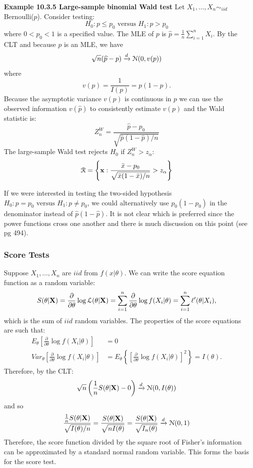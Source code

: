 \documentclass[11pt,]{article}
\newcommand{\Xndots}{X_1, \ldots, X_n}
\def\bx{{\bf x}}
\def\bX{{\bf X}}
\def\phat{{\widehat p}}
\def\xbar{\bar{ x}}
\def\Lsc{{\cal L}}
\def\Nsc{{\cal N}}
\def\Rsc{{\cal R}}
\def\sumin{\sum_{i=1}^n}
\begin{document}
\noindent\textbf{Example 10.3.5 Large-sample binomial Wald test} Let
\(\Xndots \sim_{iid}\) Bernoulli(\(p\)). Consider testing:
\[H_0: p \leq p_0 \mbox{ versus } H_1: p > p_0\] where \(0<p_0<1\) is a
specified value. The MLE of \(p\) is \(\phat = \frac{1}{n}\sumin{X_i}.\)
By the CLT and because \(\phat\) is an MLE, we have
\[\sqrt{n}(\phat - p) \xrightarrow{d} \Nsc(0, v(p))\] where
\[v(p) = \frac{1}{I(p)} = p(1-p).\] Because the asymptotic variance
\(v(p)\) is continuous in \(p\) we can use the observed information
\(v(\phat)\) to consistently estimate \(v(p)\) and the Wald statistic
is: \[Z_n^W = \frac{\phat - p_0}{\sqrt{\phat(1-\phat)/n}}\] The
large-sample Wald test rejects \(H_0\) if \(Z_n^W > z_\alpha\):
\[\Rsc =\left\{\bx:  \frac{\xbar - p_0}{\sqrt{\xbar(1-\xbar)/n}}> z_\alpha\right\}\]

If we were interested in testing the two-sided hypothesis
\(H_0: p = p_0 \mbox{ versus } H_1: p \neq p_0\), we could alternatively
use \(p_0(1-p_0)\) in the denominator instead of \(\phat(1-\phat).\) It
is not clear which is preferred since the power functions cross one
another and there is much discussion on this point (see pg 494).

\subsubsection{Score Tests}

Suppose \(\Xndots\) are \(iid\) from \(f(x|\theta)\). We can write the
score equation function as a random variable:
\[S(\theta |\bX) = \frac{\partial}{\partial\theta} \log \Lsc(\theta|\bX) = \sumin \frac{\partial}{\partial\theta} \log f(X_i |\theta) = \sumin \ell^\prime(\theta|X_i),\]
which is the sum of \(iid\) random variables. The properties of the
score equations are such that: \begin{align}
E_\theta \left[ \frac{\partial}{\partial\theta} \log f(X_i |\theta) \right] &= 0\\
Var_\theta \left[ \frac{\partial}{\partial\theta} \log f(X_i |\theta) \right] &=  E_\theta\left\{ \left[ \frac{\partial}{\partial\theta} \log f(X_i |\theta) \right]^2\right\} = I(\theta).
\end{align} Therefore, by the CLT:
\[\sqrt{n} \left( \frac{1}{n} S(\theta |\bX) - 0\right) \xrightarrow{d} \Nsc(0,I(\theta))\]
and so
\[\frac{\frac{1}{n}S(\theta|\bX)}{\sqrt{I(\theta)/n}} = \frac{S(\theta|\bX)}{\sqrt{nI(\theta)}} = \frac{S(\theta|\bX)}{\sqrt{I_n(\theta)}}\xrightarrow{d} \Nsc(0,1)\]
Therefore, the score function divided by the square root of Fisher's
information can be approximated by a standard normal random variable.
This forms the basis for the score test.
\end{document}
